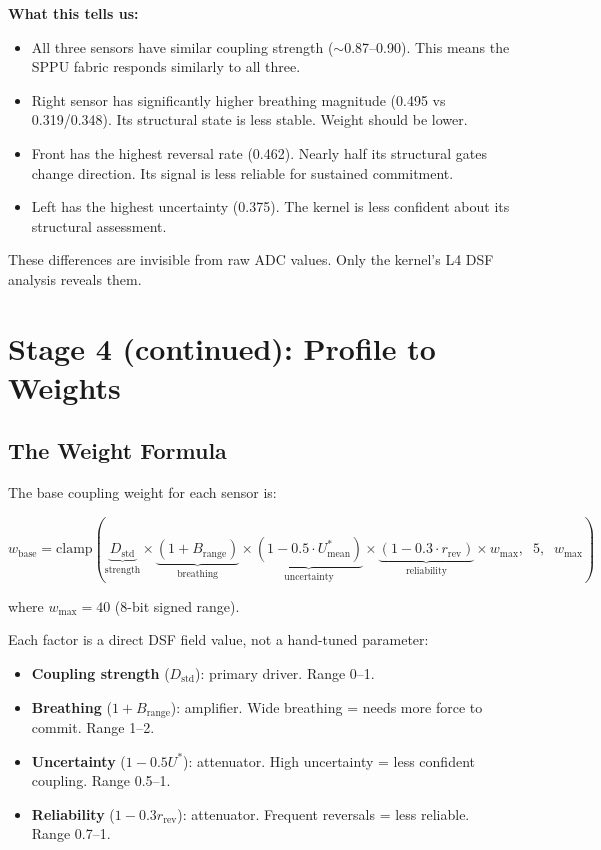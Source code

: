\documentclass[11pt,a4paper]{article}
\begin{document}
\textbf{What this tells us:}
\begin{itemize}[nosep]
\item All three sensors have similar coupling strength ($\sim$0.87--0.90). This means the SPPU fabric responds similarly to all three.
\item Right sensor has significantly higher breathing magnitude (0.495 vs 0.319/0.348). Its structural state is less stable. Weight should be lower.
\item Front has the highest reversal rate (0.462). Nearly half its structural gates change direction. Its signal is less reliable for sustained commitment.
\item Left has the highest uncertainty (0.375). The kernel is less confident about its structural assessment.
\end{itemize}

These differences are invisible from raw ADC values. Only the kernel's
L4 DSF analysis reveals them.

\section{Stage 4 (continued): Profile to Weights}

\subsection{The Weight Formula}

The base coupling weight for each sensor is:

\begin{equation}
w_{\text{base}} = \text{clamp}\left(
    \underbrace{D_{\text{std}}}_{\text{strength}}
    \times \underbrace{(1 + B_{\text{range}})}_{\text{breathing}}
    \times \underbrace{(1 - 0.5 \cdot U^*_{\text{mean}})}_{\text{uncertainty}}
    \times \underbrace{(1 - 0.3 \cdot r_{\text{rev}})}_{\text{reliability}}
    \times w_{\text{max}},\;\; 5,\;\; w_{\text{max}}
\right)
\label{eq:base_weight}
\end{equation}

where $w_{\text{max}} = 40$ (8-bit signed range).

Each factor is a direct DSF field value, not a hand-tuned parameter:
\begin{itemize}[nosep]
\item \textbf{Coupling strength} ($D_{\text{std}}$): primary driver. Range 0--1.
\item \textbf{Breathing} ($1 + B_{\text{range}}$): amplifier. Wide breathing = needs more force to commit. Range 1--2.
\item \textbf{Uncertainty} ($1 - 0.5 U^*$): attenuator. High uncertainty = less confident coupling. Range 0.5--1.
\item \textbf{Reliability} ($1 - 0.3 r_{\text{rev}}$): attenuator. Frequent reversals = less reliable. Range 0.7--1.
\end{itemize}
\end{document}
